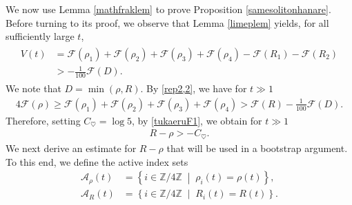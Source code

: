 \documentclass[10pt,a4paper]{amsart}
\numberwithin{equation}{section}
\begin{document}
We now use Lemma \ref{mathfraklem} to prove Proposition \ref{samesolitonhanare}. Before turning to its proof, we observe that Lemma \ref{limeplem} yields, for all sufficiently large $t$,
\begin{align}\label{rep2,2}
\begin{aligned}
V(t)&=
\mathcal{F}(\rho_1)+\mathcal{F}(\rho_2)+\mathcal{F}(\rho_3)+\mathcal{F}(\rho_4)-\mathcal{F}(R_1)-\mathcal{F}(R_2)
\\
&>-\frac{1}{100}\mathcal{F}(D).
\end{aligned}
\end{align}
We note that $D=\min{(\rho,R)}$. By \eqref{rep2,2}, we have for $t\gg 1$
\begin{align}\label{subsec3.2detukau1}
4\mathcal{F}(\rho)\geq \mathcal{F}(\rho_1)+\mathcal{F}(\rho_2)+\mathcal{F}(\rho_3)+\mathcal{F}(\rho_4)>\mathcal{F}(R)-\frac{1}{100}\mathcal{F}(D).
\end{align}
Therefore, setting $C_{\heartsuit}=\log{5}$, by \eqref{tukaeruF1}, we obtain for $t\gg 1$
\begin{align}\label{taikakues1}
R-\rho>-C_{\heartsuit}.
\end{align}
We next derive an estimate for $R-\rho$ that will be used in a bootstrap argument. To this end, we define the active index sets
\begin{align*}
\mathcal{A}_{\rho}(t)
&=
\left\{
i\in\mathbb{Z}/4\mathbb{Z}
\;\middle|\;
\rho_i(t)=\rho(t)
\right\},
\\
\mathcal{A}_{R}(t)
&=
\left\{
i\in\mathbb{Z}/4\mathbb{Z}
\;\middle|\;
R_i(t)=R(t)
\right\}.
\end{align*}
\end{document}
